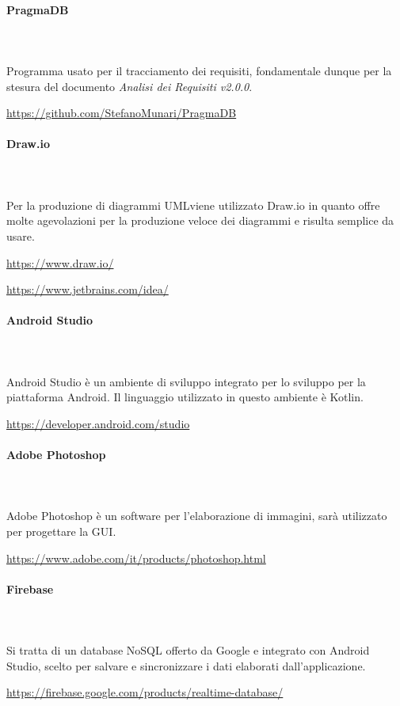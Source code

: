 		\paragraph{PragmaDB} \mbox{}\\ \mbox{}\\
		Programma usato per il tracciamento dei requisiti, fondamentale dunque per la stesura del documento \textit{Analisi dei Requisiti v2.0.0}. \newline
		\centerline{\url{https://github.com/StefanoMunari/PragmaDB}}
		\paragraph{Draw.io} \mbox{}\\ \mbox{}\\
		Per la produzione di diagrammi UML\glosp viene utilizzato Draw.io in quanto offre molte agevolazioni per la produzione veloce dei diagrammi e risulta semplice da usare. \newline
		\centerline{\url{https://www.draw.io/}}
		\centerline{\url{https://www.jetbrains.com/idea/}}
		\paragraph{Android Studio} \mbox{}\\ \mbox{}\\
		Android Studio è un ambiente di sviluppo integrato per lo sviluppo per la piattaforma Android\glo. Il linguaggio utilizzato in questo ambiente è Kotlin\glo.
		 \newline
		\centerline{\url{https://developer.android.com/studio}}
		\paragraph{Adobe Photoshop} \mbox{}\\ \mbox{}\\
		Adobe Photoshop è un software per l'elaborazione di immagini, sarà utilizzato per progettare la GUI\glo.
		\newline
		\centerline{\url{https://www.adobe.com/it/products/photoshop.html}}
		\paragraph{Firebase} \mbox{}\\ \mbox{}\\
		Si tratta di un database NoSQL offerto da Google e integrato con Android Studio, scelto per salvare e sincronizzare i dati elaborati dall'applicazione.
		\newline
		\centerline{\url{https://firebase.google.com/products/realtime-database/}}
